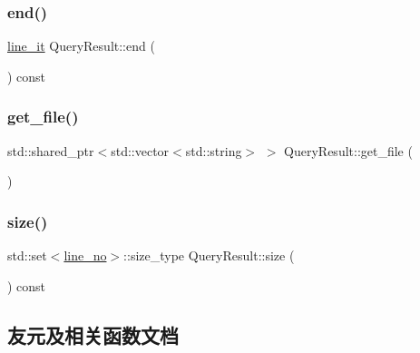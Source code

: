 \mbox{\label{classQueryResult_a5ba21e424a2db6b4e91bc0079b165b70}} 
\subsubsection{\texorpdfstring{end()}{end()}}
{\footnotesize\ttfamily \hyperlink{classQueryResult_a863424dfa74a1048fdcb636a98aea670}{line\+\_\+it} Query\+Result\+::end (\begin{DoxyParamCaption}{ }\end{DoxyParamCaption}) const\hspace{0.3cm}{\ttfamily [inline]}}

\mbox{\label{classQueryResult_af9b8d280bfe034dd1f7046036a98df93}} 
\subsubsection{\texorpdfstring{get\+\_\+file()}{get\_file()}}
{\footnotesize\ttfamily std\+::shared\+\_\+ptr$<$std\+::vector$<$std\+::string$>$ $>$ Query\+Result\+::get\+\_\+file (\begin{DoxyParamCaption}{ }\end{DoxyParamCaption})\hspace{0.3cm}{\ttfamily [inline]}}

\mbox{\label{classQueryResult_af4d3e42b7cf43c88783069d484796052}} 
\subsubsection{\texorpdfstring{size()}{size()}}
{\footnotesize\ttfamily std\+::set$<$\hyperlink{classQueryResult_a34e6c64fb173f43499443469009c262f}{line\+\_\+no}$>$\+::size\+\_\+type Query\+Result\+::size (\begin{DoxyParamCaption}{ }\end{DoxyParamCaption}) const\hspace{0.3cm}{\ttfamily [inline]}}



\subsection{友元及相关函数文档}
\mbox{\label{classQueryResult_ab20f9885050aa16c68eaeff6f8d9db7d}} 
